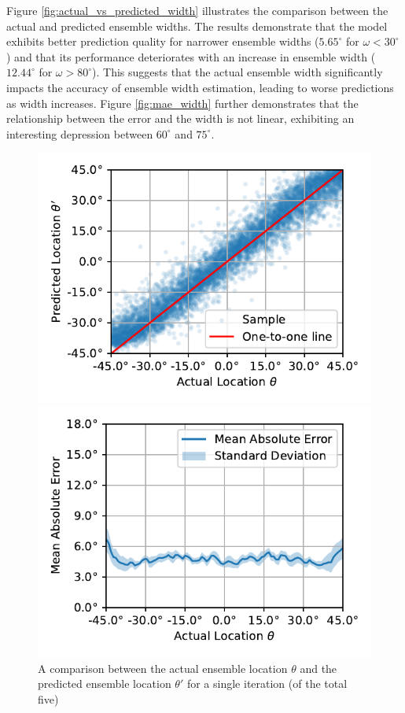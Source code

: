 \documentclass{article}
\begin{document}
Figure \ref{fig:actual_vs_predicted_width} illustrates the comparison between the actual and predicted ensemble widths. The results demonstrate that the model exhibits better prediction quality for narrower ensemble widths ($5.65^\circ$ for $\omega < 30^\circ$) and that its performance deteriorates with an increase in ensemble width ($12.44^\circ$ for $\omega > 80^\circ$). This suggests that the actual ensemble width significantly impacts the accuracy of ensemble width estimation, leading to worse predictions as width increases. Figure \ref{fig:mae_width} further demonstrates that the relationship between the error and the width is not linear, exhibiting an interesting depression between $60^\circ$ and $75^\circ$.

\begin{figure}[ht]
  \centering
  \begin{minipage}[t]{0.45\linewidth}
    \includegraphics[width=\linewidth]{../figures/actual_vs_predicted_location.pdf}
    \caption{\label{fig:actual_vs_predicted_location}A comparison between the actual ensemble location $\theta$ and the predicted ensemble location $\theta'$ for a single iteration (of the total five) }
  \end{minipage}
  \hspace{0.5cm}
  \begin{minipage}[t]{0.45\linewidth}
    \includegraphics[width=\linewidth]{../figures/mae_location.pdf}

\end{minipage}
\end{figure}
\end{document}
